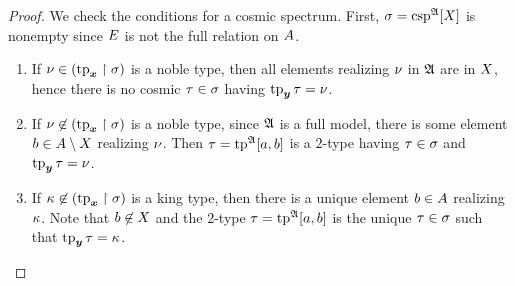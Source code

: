 \begin{proof}
We check the conditions for a cosmic spectrum. First, $\sigma = \operatorname{csp}^{\mathfrak{A}}[X]$
is nonempty since $E$ is not the full relation on $A$.
\begin{enumerate}
  \item If $\nu \in (\operatorname{tp}_{\bm{x}}\restriction\sigma)$ is a noble type, then all
  elements realizing $\nu$ in $\mathfrak{A}$ are in $X$, hence there is no cosmic
  $\tau \in \sigma$ having $\operatorname{tp}_{\bm{y}}\tau = \nu$.
  \item If $\nu \not\in (\operatorname{tp}_{\bm{x}}\restriction\sigma)$ is a noble type,
  since $\mathfrak{A}$ is a full model, there is some element $b \in A \setminus
  X$ realizing $\nu$. Then $\tau = \operatorname{tp}^{\mathfrak{A}}[a,b]$ is a $2$-type
  having $\tau \in \sigma$ and $\operatorname{tp}_{\bm{y}}\tau = \nu$.
  \item If $\kappa \not\in (\operatorname{tp}_{\bm{x}}\restriction\sigma)$ is a king type, then there is
  a unique element $b \in A$ realizing $\kappa$.
  Note that $b \not\in X$ and the $2$-type
  $\tau = \operatorname{tp}^{\mathfrak{A}}[a,b]$ is the unique $\tau \in \sigma$ such that
  $\operatorname{tp}_{\bm{y}}\tau = \kappa$.
\end{enumerate}
\end{proof}

